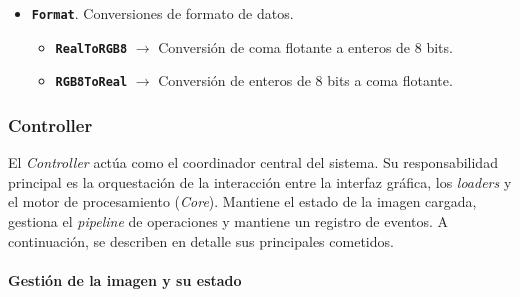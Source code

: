 \begin{itemize}[noitemsep]
\begin{itemize}[noitemsep]
        diferentes módulos de \textit{demosaicing} que implican distintos compromisos entre calidad y rendimiento:
        \begin{itemize}[noitemsep]
            \item \texttt{\textbf{Debayer2x2}} $\rightarrow$ Interpolación bilineal básica.
            \item \texttt{\textbf{Debayer3x3}} $\rightarrow$ Interpolación con kernel 3x3.
            \item \texttt{\textbf{Debayer5x5}} $\rightarrow$ Interpolación con kernel 5x5.
            \item \texttt{\textbf{DebayerSplit}} $\rightarrow$ Método alternativo basado en separación de canales.
        \end{itemize}
    \end{itemize}
    \vspace{0.15cm}
    \item \texttt{\textbf{Format}}. Conversiones de formato de datos.
    \begin{itemize}[noitemsep]
        \item \texttt{\textbf{RealToRGB8}} $\rightarrow$ Conversión de coma flotante a enteros de 8 bits.
        \item \texttt{\textbf{RGB8ToReal}} $\rightarrow$ Conversión de enteros de 8 bits a coma flotante.
    \end{itemize}
\end{itemize}

\newpage

\subsubsection{Controller} \label{subsubsec:7_3_4_controller}
El \textit{Controller} actúa como el coordinador central del sistema. Su responsabilidad principal es la 
orquestación de la interacción entre la interfaz gráfica, los \textit{loaders} y el motor de 
procesamiento (\textit{Core}). Mantiene el estado de la imagen cargada, gestiona el \textit{pipeline} de operaciones 
y mantiene un registro de eventos. A continuación, se describen en detalle sus principales cometidos.

\paragraph{Gestión de la imagen y su estado} \label{par:7_3_4_1_gestion_imagen_estado}

